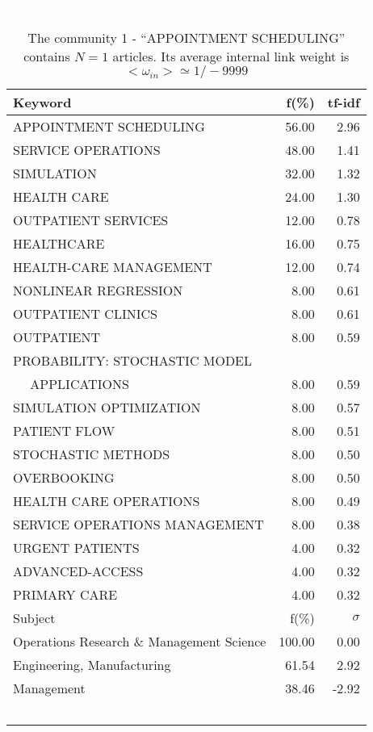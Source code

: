 \documentclass[a4paper,11pt]{report}
\begin{document}
\begin{landscape}
\clearpage

\begin{table}[!ht]
\caption{The community 1 - ``APPOINTMENT SCHEDULING'' contains $N = 1$ articles. Its average internal link weight is $<\omega_{in}> \simeq 1/-9999$ }
\textcolor{white}{aa}\\
{\scriptsize\begin{tabular}{|l r  r|}
\hline
Keyword & f(\%) & tf-idf \\
\hline
APPOINTMENT SCHEDULING & 56.00 & 2.96\\
SERVICE OPERATIONS & 48.00 & 1.41\\
SIMULATION & 32.00 & 1.32\\
HEALTH CARE & 24.00 & 1.30\\
OUTPATIENT SERVICES & 12.00 & 0.78\\
HEALTHCARE & 16.00 & 0.75\\
HEALTH-CARE MANAGEMENT & 12.00 & 0.74\\
NONLINEAR REGRESSION & 8.00 & 0.61\\
OUTPATIENT CLINICS & 8.00 & 0.61\\
OUTPATIENT & 8.00 & 0.59\\
PROBABILITY: STOCHASTIC MODEL &  &\\
$\quad$ APPLICATIONS & 8.00 & 0.59\\
SIMULATION OPTIMIZATION & 8.00 & 0.57\\
PATIENT FLOW & 8.00 & 0.51\\
STOCHASTIC METHODS & 8.00 & 0.50\\
OVERBOOKING & 8.00 & 0.50\\
HEALTH CARE OPERATIONS & 8.00 & 0.49\\
SERVICE OPERATIONS MANAGEMENT & 8.00 & 0.38\\
URGENT PATIENTS & 4.00 & 0.32\\
ADVANCED-ACCESS & 4.00 & 0.32\\
PRIMARY CARE & 4.00 & 0.32\\
\hline
\hline
Subject & f(\%) & $\sigma$\\
\hline
Operations Research \& Management Science & 100.00 & 0.00\\
Engineering, Manufacturing & 61.54 & 2.92\\
Management & 38.46 & -2.92\\
 &  & \\
 &  & \\
 &  & \\
 &  & \\
 &  & \\

\end{tabular}}
\end{table}
\end{landscape}
\end{document}
